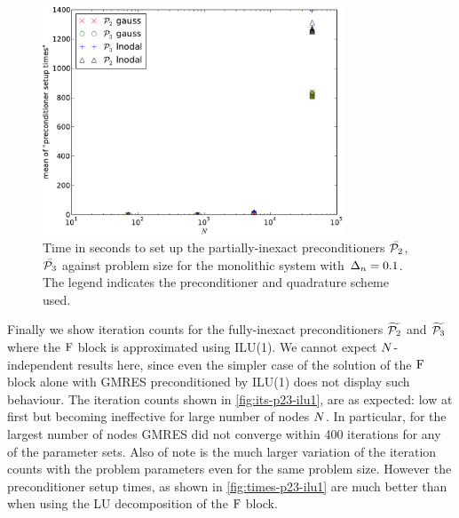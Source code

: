 \begin{figure}
  \centering
  \includegraphics[width=0.8\textwidth]{plots/linear_solvers_p2p3/implicitexact-meanofpreconditionersetuptimesvsinitialnnode.pdf}
  \caption{Time in seconds to set up the partially-inexact preconditioners $\bar{\mathcal{P}_2}$, $\bar{\mathcal{P}_3}$ against problem size for the monolithic system with $\Delta_{n}=0.1$.
    The legend indicates the preconditioner and quadrature scheme used.
}
  \label{fig:times-p23-exact}
\end{figure}


Finally we show iteration counts for the fully-inexact preconditioners $\widetilde{\mathcal{P}_2}$ and $\widetilde{\mathcal{P}_3}$ where the $\mathrm{F}$ block is approximated using ILU(1).
We cannot expect $N$-independent results here, since even the simpler case of the solution of the $\mathrm{F}$ block alone with GMRES preconditioned by ILU(1) does not display such behaviour.
The iteration counts shown in \cref{fig:its-p23-ilu1}, are as expected: low at first but becoming ineffective for large number of nodes $N$.
In particular, for the largest number of nodes GMRES did not converge within 400 iterations for any of the parameter sets.
Also of note is the much larger variation of the iteration counts with the problem parameters even for the same problem size.
However the preconditioner setup times, as shown in \cref{fig:times-p23-ilu1} are much better than when using the LU decomposition of the $\mathrm{F}$ block.


